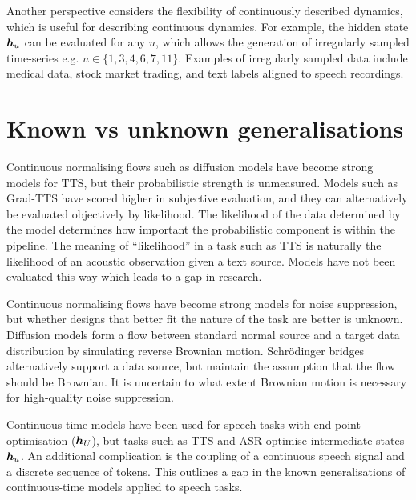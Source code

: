Another perspective considers the flexibility of continuously described dynamics, which is useful for describing continuous dynamics. For example, the hidden state ${\bm{h}}_u$ can be evaluated for any $u$, which allows the generation of irregularly sampled time-series e.g. $u\in\{1,3,4,6,7,11\}$. Examples of irregularly sampled data include medical data, stock market trading, and text labels aligned to speech recordings.







\section{Known vs unknown generalisations}

Continuous normalising flows such as diffusion models have become strong models for \ac{TTS}, but their probabilistic strength is unmeasured. Models such as Grad-TTS have scored higher in subjective evaluation, and they can alternatively be evaluated objectively by likelihood. The likelihood of the data determined by the model determines how important the probabilistic component is within the pipeline. The meaning of ``likelihood'' in a task such as \ac{TTS} is naturally the likelihood of an acoustic observation given a text source. Models have not been evaluated this way which leads to a gap in research.

Continuous normalising flows have become strong models for noise suppression, but whether designs that better fit the nature of the task are better is unknown. Diffusion models form a flow between standard normal source and a target data distribution by simulating reverse Brownian motion. Schr\"odinger bridges alternatively support a data source, but maintain the assumption that the flow should be Brownian. It is uncertain to what extent Brownian motion is necessary for high-quality noise suppression.

Continuous-time models have been used for speech tasks with end-point optimisation (${\bm{h}}_U$), but tasks such as \ac{TTS} and \ac{ASR} optimise intermediate states ${\bm{h}}_u$. An additional complication is the coupling of a continuous speech signal and a discrete sequence of tokens. This outlines a gap in the known generalisations of continuous-time models applied to speech tasks.



